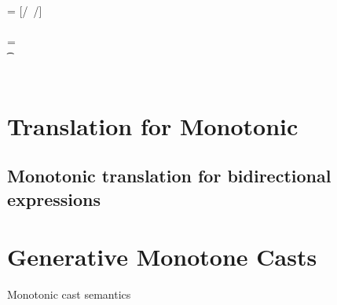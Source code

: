\documentclass[sigconf]{acmart}
\begin{document}
\begin{figure*}[!h]
\begin{minipage}{0.45\textwidth}
\begin{tabbing}
\> \> \> \> \> \> \> \StrSub {\emptyset} \tp
\\
 \K\HS {\DynCall\a\m\ap}\> \s        \>\Red\>    \K \> \ep \> \s \>  \WHERE\> \ep = {[\a/\this~{\ap/\x}]\e}\HS \\ \> \> \> \> \> \> \> \Mdef\m\x\any\any\e \In \App\K\C \\ \> \> \> \> \> \> \> \App\s\a=\obj{} 
\\
 \K\HS {\MonCast \t\a} \> \s         \>\Red\>   \Kp \> \ap \> \sp \> \WHERE\> \moncast \a\t\s\K \Kp\ap\sp    
\\
\K \HS \EM{\EE[\e]} \> \s            \>\Red\>   \Kp \> \EM{\EE[\ep]} \> \sp \> \WHERE \> \K~\e~\s \Red~\Kp~\ep~\sp
\end{tabbing}\end{minipage}\vspace{2mm}
\noindent\hrulefill\caption{\kafka syntax, static and dynamic semantics, and
  monotonic translation.}\label{syn}
\end{figure*}


\section{Translation for Monotonic}


\subsection{Monotonic translation for bidirectional expressions}


\section{Generative Monotone Casts}

\begin{mathpar}
\end{mathpar}
{Monotonic cast semantics}
\end{document}
